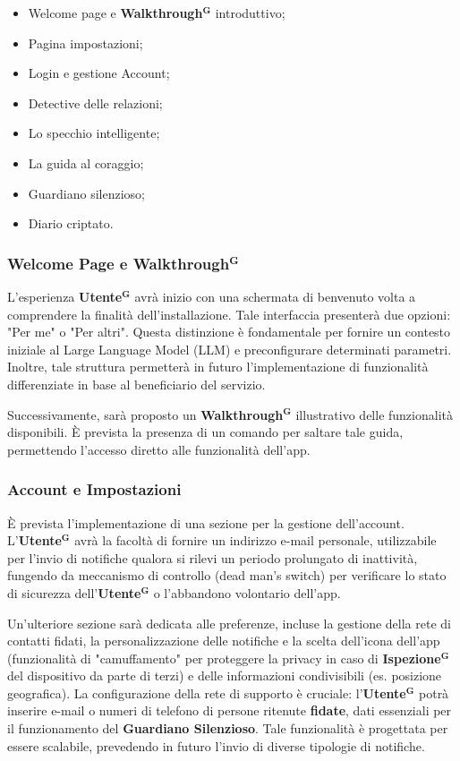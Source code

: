 \documentclass[a4paper,12pt]{article}
\newcommand{\term}[1]{\textbf{#1}$^\mathbf{G}$}
\begin{document}
\begin{itemize}
    \item Welcome page e \term{Walkthrough} introduttivo;
    \item Pagina impostazioni;
    \item Login e gestione Account;
    \item Detective delle relazioni;
    \item Lo specchio intelligente;
    \item La guida al coraggio;
    \item Guardiano silenzioso;
    \item Diario criptato.
\end{itemize}

\subsubsection{Welcome Page e \term{Walkthrough}}
L'esperienza \term{Utente} avrà inizio con una schermata di benvenuto volta a comprendere la finalità dell'installazione. Tale interfaccia presenterà due opzioni: "Per me" o "Per altri". Questa distinzione è fondamentale per fornire un contesto iniziale al Large Language Model (LLM) e preconfigurare determinati parametri. Inoltre, tale struttura permetterà in futuro l'implementazione di funzionalità differenziate in base al beneficiario del servizio.

Successivamente, sarà proposto un \term{Walkthrough} illustrativo delle funzionalità disponibili. È prevista la presenza di un comando per saltare tale guida, permettendo l'accesso diretto alle funzionalità dell'app.

\subsubsection{Account e Impostazioni}
È prevista l'implementazione di una sezione per la gestione dell'account. L'\term{Utente} avrà la facoltà di fornire un indirizzo e-mail personale, utilizzabile per l'invio di notifiche qualora si rilevi un periodo prolungato di inattività, fungendo da meccanismo di controllo (dead man's switch) per verificare lo stato di sicurezza dell'\term{Utente} o l'abbandono volontario dell'app.

Un'ulteriore sezione sarà dedicata alle preferenze, incluse la gestione della rete di contatti fidati, la personalizzazione delle notifiche e la scelta dell'icona dell'app (funzionalità di "camuffamento" per proteggere la privacy in caso di \term{Ispezione} del dispositivo da parte di terzi) e delle informazioni condivisibili (es. posizione geografica). La configurazione della rete di supporto è cruciale: l'\term{Utente} potrà inserire e-mail o numeri di telefono di persone ritenute \textbf{fidate}, dati essenziali per il funzionamento del \textbf{Guardiano Silenzioso}. Tale funzionalità è progettata per essere scalabile, prevedendo in futuro l'invio di diverse tipologie di notifiche.
\end{document}

